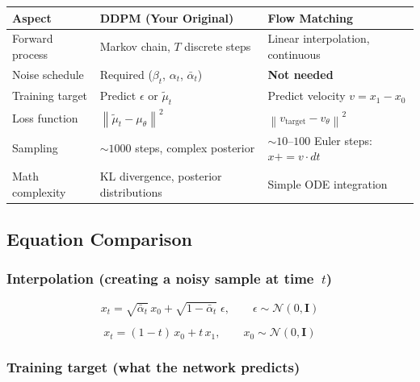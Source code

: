 \documentclass[11pt, a4paper]{article}
\newcommand{\vtheta}{v_\theta}
\newcommand{\mutheta}{\mu_\theta}
\newcommand{\mutilde}{\tilde{\mu}}
\newcommand{\alphabar}{\bar{\alpha}}
\newcommand{\N}{\mathcal{N}}
\newcommand{\Id}{\mathbf{I}}
\newcommand{\norm}[1]{\left\lVert #1 \right\rVert}
\begin{document}
\begin{center}
\renewcommand{\arraystretch}{1.4}
\begin{tabular}{@{} >{\raggedright\arraybackslash}p{3.2cm}
                    >{\raggedright\arraybackslash}p{5.5cm}
                    >{\raggedright\arraybackslash}p{5.5cm} @{}}
\toprule
\textbf{Aspect} & \textbf{DDPM (Your Original)} & \textbf{Flow Matching} \\
\midrule
Forward process &
  Markov chain, $T$ discrete steps &
  Linear interpolation, continuous \\
Noise schedule &
  Required ($\beta_t$, $\alpha_t$, $\alphabar_t$) &
  \textbf{Not needed} \\
Training target &
  Predict $\epsilon$ or $\mutilde_t$ &
  Predict velocity $v = x_1 - x_0$ \\
Loss function &
  $\norm{\mutilde_t - \mutheta}^2$ &
  $\norm{v_{\mathrm{target}} - \vtheta}^2$ \\
Sampling &
  ${\sim}1000$ steps, complex posterior &
  ${\sim}10$--$100$ Euler steps: $x \mathrel{{+}{=}} v \cdot dt$ \\
Math complexity &
  KL divergence, posterior distributions &
  Simple ODE integration \\
\bottomrule
\end{tabular}
\end{center}

\subsection{Equation Comparison}

\subsubsection*{Interpolation (creating a noisy sample at time~$t$)}

\begin{ddpmbox}
\vspace{-0.5em}
\[
  x_t = \sqrt{\alphabar_t}\, x_0
      + \sqrt{1 - \alphabar_t}\;\epsilon,
  \qquad \epsilon \sim \N(0, \Id)
\]
\end{ddpmbox}

\begin{fmbox}
\vspace{-0.5em}
\[
  x_t = (1 - t)\, x_0 + t\, x_1,
  \qquad x_0 \sim \N(0, \Id)
\]
\end{fmbox}

\subsubsection*{Training target (what the network predicts)}
\end{document}
